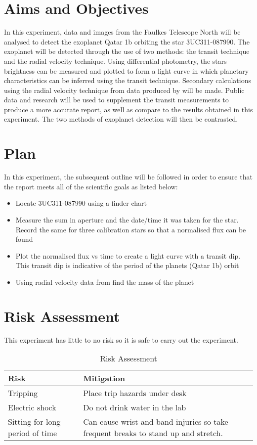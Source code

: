 \documentclass[10pt]{article}
\begin{document}
\section{Aims and Objectives}

In this experiment, data and images from the Faulkes Telescope North will be analysed to detect the exoplanet Qatar 1b orbiting the star 3UC311-087990. The exoplanet will be detected through the use of two methods: the transit technique and the radial velocity technique. Using differential photometry, the stars brightness can be measured and plotted to form a light curve in which planetary characteristics can be inferred using the transit technique. Secondary calculations using the radial velocity technique from data produced by \cite{Alsubai_2011} will be made. Public data and research will be used to supplement the transit measurements to produce a more accurate report, as well as compare to the results obtained in this experiment. The two methods of exoplanet detection will then be contrasted. 
\section{Plan}
In this experiment, the subsequent outline will be followed in order to ensure that the report meets all of the scientific goals as listed below:
\begin{itemize}
	\item Locate 3UC311-087990 using a finder chart \cite[p.76]{labhandbook}
	\item Measure the sum in aperture and the date/time it was taken for the star. Record the same for three calibration stars so that a normalised flux can be found
	\item Plot the normalised flux vs time to create a light curve with a transit dip. This transit dip is indicative of the period of the planets (Qatar 1b) orbit
	\item Using radial velocity data from \cite{Alsubai_2011} find the mass of the planet
\end{itemize}
\section{Risk Assessment}
This experiment has little to no risk so it is safe to carry out the experiment.
\begin{table}[H]
	\centering
	\caption{Risk Assessment}
	\begin{tabular}{p{}p{}}
		\toprule
		Risk & Mitigation \\
		\midrule
		Tripping & Place trip hazards under desk \\
		\addlinespace
		\cellcolor{gray!10} Electric shock & \cellcolor{gray!10} Do not drink water in the lab \\
		\addlinespace
		Sitting for long period of time & Can cause wrist and band injuries so take frequent breaks to stand up and stretch. \\
		\bottomrule
	\end{tabular}
	\label{tab:riskassesment}
\end{table}
\pagebreak
\end{document}
